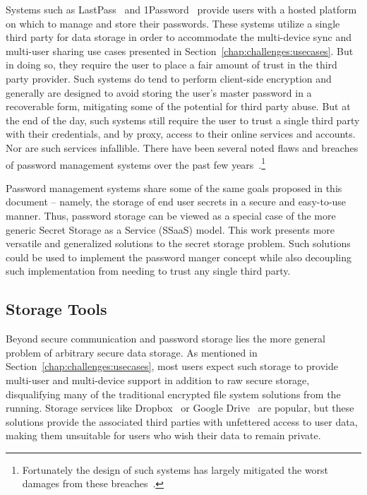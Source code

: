 Systems such as LastPass~\cite{lastpass} and
1Password~\cite{onepassword} provide users with a hosted platform on
which to manage and store their passwords. These systems utilize a
single third party for data storage in order to accommodate the
multi-device sync and multi-user sharing use cases presented in
Section~\ref{chap:challenges:usecases}. But in doing so, they require
the user to place a fair amount of trust in the third party
provider. Such systems do tend to perform client-side encryption and
generally are designed to avoid storing the user's master password in
a recoverable form, mitigating some of the potential for third party
abuse. But at the end of the day, such systems still require the user
to trust a single third party with their credentials, and by proxy,
access to their online services and accounts. Nor are such services
infallible. There have been several noted flaws and breaches of
password management systems over the past few
years~\cite{blackhat-lastpass, changedmy-lastpass,
  lastpass-blog-breach}.\footnote{Fortunately the design of such
  systems has largely mitigated the worst damages from these
  breaches~\cite{ducklin2015}.}

Password management systems share some of the same goals proposed in
this document -- namely, the storage of end user secrets in a secure
and easy-to-use manner. Thus, password storage can be viewed as a
special case of the more generic Secret Storage as a Service (SSaaS)
model. This work presents more versatile and generalized solutions to
the secret storage problem. Such solutions could be used to implement
the password manger concept while also decoupling such implementation
from needing to trust any single third party.

\subsection{Storage Tools}

Beyond secure communication and password storage lies the more general
problem of arbitrary secure data storage. As mentioned in
Section~\ref{chap:challenges:usecases}, most users expect such storage
to provide multi-user and multi-device support in addition to raw
secure storage, disqualifying many of the traditional encrypted file
system solutions from the running. Storage services like
Dropbox~\cite{dropbox} or Google Drive~\cite{google-drive} are
popular, but these solutions provide the associated third parties with
unfettered access to user data, making them unsuitable for users who
wish their data to remain private.

